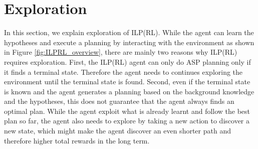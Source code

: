 
\section{Exploration}
\label{exploration}
In this section, we explain exploration of ILP(RL). While the agent can learn the hypotheses and execute a planning by interacting with the environment as shown in Figure \ref{fig:ILPRL_overview},
there are mainly two reasons why ILP(RL) requires exploration. 
First, the ILP(RL) agent can only do ASP planning only if it finds a terminal state. 
Therefore the agent needs to continues exploring the environment until the terminal state is found. 
Second, even if the terminal state is known and the agent generates a planning based on the background knowledge and the hypotheses, 
this does not guarantee that the agent always finds an optimal plan.
While the agent exploit what is already learnt and follow the best plan so far,
the agent also needs to explore by taking a new action to discover a new state, which might make the agent discover an even shorter path and therefore higher total rewards in the long term.

